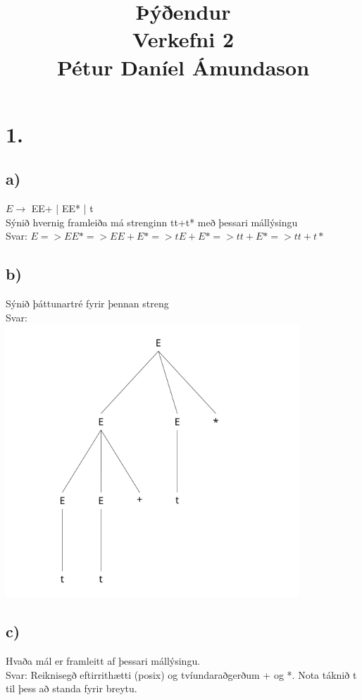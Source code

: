 \documentclass[]{article}
\begin{document}
\title{Þýðendur \\
	Verkefni 2\\
	Pétur Daníel Ámundason\\
	}
\maketitle

\section*{1.}
\subsection*{a)}
$E \rightarrow$ EE+ | EE* | t \\
Sýnið hvernig framleiða má strenginn tt+t* með þessari mállýsingu \\
Svar: $E => EE* => EE+E* => tE+E* => tt+E* => tt+t*$ \\

\subsection*{b)}
Sýnið þáttunartré fyrir þennan streng\\
Svar: \\

\includegraphics[scale=0.5]{tree}

\subsection*{c)}
Hvaða mál er framleitt af þessari mállýsingu. \\
Svar: Reiknisegð eftirrithætti (posix) og tvíundaraðgerðum + og *. Nota táknið t til þess að standa fyrir breytu.
\end{document}
